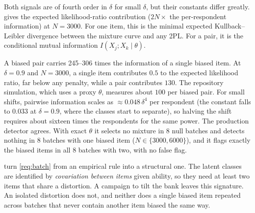 Both signals are of fourth order in $\delta$ for small $\delta$, but their constants differ
greatly.  gives the expected likelihood-ratio contribution
($2N\times$ the per-respondent information) at $N=3000$. For one item, this is the minimal
expected Kullback--Leibler divergence between the mixture curve and any 2PL. For a pair, it is
the conditional mutual information $I(X_j;X_k\mid\theta)$.

\begin{table}[t]
\centering\small
\caption{Expected likelihood-ratio contribution at $N=3000$ of one biased item (the part no 2PL
absorbs) and of one biased pair (conditional mutual information), for $a=1.25$, $b=0$,
$\pi=\tfrac12$ and exact $\theta$. For comparison, the BIC penalty per extra parameter is
$\ln 3000\approx8$. Source: \texttt{scripts/levelB\_information.py}.}
\label{tab:information}
\end{table}

\begin{finding}\label{find:information}\empirical{}
A biased pair carries 245--306 times the information of a single biased item. At $\delta=0.9$
and $N=3000$, a single item contributes $0.5$ to the expected likelihood ratio, far below any
penalty, while a pair contributes $130$. The repository simulation, which uses a proxy $\theta$,
measures about $100$ per biased pair. For small shifts, pairwise information scales as
$\approx0.048\,\delta^4$ per respondent (the constant falls to $0.033$ at $\delta=0.9$, where the
classes start to separate), so halving the shift requires about sixteen times the respondents for
the same power. The production detector agrees. With exact $\theta$ it selects no mixture in 8
null batches and detects nothing in 8 batches with one biased item ($N\in\{3000,6000\}$), and it
flags exactly the biased items in all 8 batches with two, with no false flag.
\end{finding}

 turn \cref{req:batch} from an empirical rule into a structural one.
The latent classes are identified by \emph{covariation between items} given ability, so they need
at least two items that share a distortion. A campaign to tilt the bank leaves this signature. An
isolated distortion does not, and neither does a single biased item repeated across batches that
never contain another item biased the same way.

